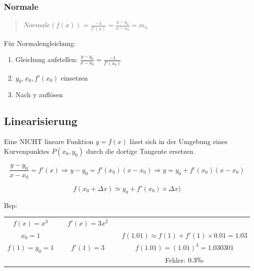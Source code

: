 \subsubsection*{Normale}
\begin{quote}
$Normale(f(x))=\frac{-1}{f'(x)}=\frac{y-y_{0}}{x-x_{0}}=m_{n}$
\end{quote}
Für Normalengleichung:
\begin{enumerate}
\item Gleichung aufstellen: $\frac{y-y_{0}}{x-x_{0}}=\frac{-1}{f'(x_{0})}$
\item $y_{0},x_{0},f'(x_{0})$ einsetzen
\item Nach y auflösen
\end{enumerate}

\subsection*{Linearisierung}

Eine NICHT lineare Funktion $y=f(x)$ lässt sich in der Umgebung eines
Kurvenpunktes $P(x_{0},y_{0})$ durch die dortige Tangente ersetzen.

\[
\frac{y-y_{0}}{x-x_{0}}=f'(x)\Rightarrow y-y_{0}=f'(x_{0})(x-x_{0})\Rightarrow y=y_{0}+f'(x_{0})(x-x_{0})
\]


\[
f(x_{0}+\Delta x)\simeq y_{0}+f'(x_{0})\times\Delta x)
\]


Bsp:

\begin{tabular}{|c|c|c|cc}
\cline{1-1} \cline{3-3} 
$f(x)=x^{3}$ &  & $f'(x)=3x^{2}$ &  & \tabularnewline
\cline{1-1} \cline{3-3} 
$x_{0}=1$ & \multicolumn{1}{c}{} & \multicolumn{1}{c}{} &  & $f(1.01)\approx f(1)+f'(1)\times0.01=1.03$\tabularnewline
\cline{1-1} \cline{3-3} 
$f(1)=y_{0}=1$ &  & $f'(1)=3$ &  & $f(1.01)=(1.01)^{3}=1.030301$\tabularnewline
\cline{1-1} \cline{3-3} 
\multicolumn{1}{c}{} & \multicolumn{1}{c}{} & \multicolumn{1}{c}{} &  & Fehler: $0.3\permil$\tabularnewline
\end{tabular}


